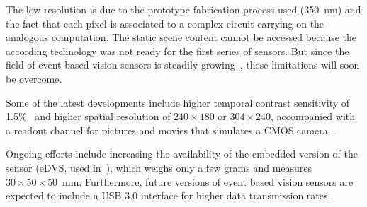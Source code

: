 The low resolution is due to the prototype fabrication process used
(350~nm) and the fact that each pixel is associated to a complex
circuit carrying on the analogous computation. The static scene content
cannot be accessed because the according technology was not ready
for the first series of sensors. But since the field of event-based
vision sensors is steadily growing~\cite{delbruck10activity}, these
limitations will soon be overcome. 

Some of the latest developments include higher temporal contrast sensitivity
of 1.5\%~\cite{serrano13128} and higher spatial resolution of $240\times180$
or $304\times240$, accompanied with a readout channel for pictures
and movies that simulates a CMOS camera~\cite{posch11qvga,berner13240}. 

Ongoing efforts include increasing the availability of the embedded
version of the sensor (eDVS, used in~\cite{conradt09pencil}), which
weighs only a few grams and measures $30\times50\times50$~mm. Furthermore,
future versions of event based vision sensors are expected to include
a USB 3.0 interface for higher data transmission rates.






